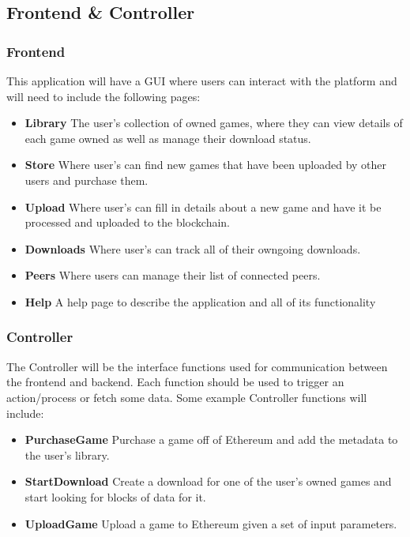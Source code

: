 \subsection{Frontend \& Controller}

\subsubsection{Frontend}

This application will have a GUI   where users can interact with the platform and will need to include the following pages:

\begin{itemize}
  \item \textbf{Library} The user's collection of owned games, where they can view details of each game owned as well as manage their download status.
  \item \textbf{Store} Where user's can find new games that have been uploaded by other users and purchase them.
  \item \textbf{Upload} Where user's can fill in details about a new game and have it be processed and uploaded to the blockchain.
  \item \textbf{Downloads} Where user's can track all of their owngoing downloads.
  \item \textbf{Peers} Where users can manage their list of connected peers.
  \item \textbf{Help} A help page to describe the application and all of its functionality 
\end{itemize}


\subsubsection{Controller}

The Controller will be the interface functions used for communication between the frontend and backend. Each function should be used to trigger an action/process or fetch some data. Some example Controller functions will include:

\begin{itemize}
  \item \textbf{PurchaseGame} Purchase a game off of Ethereum and add the metadata to the user's library.
  \item \textbf{StartDownload} Create a download for one of the user's owned games and start looking for blocks of data for it.
  \item \textbf{UploadGame} Upload a game to Ethereum given a set of input parameters.
\end{itemize}